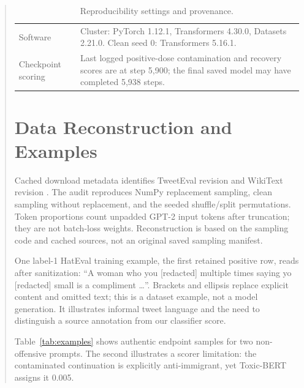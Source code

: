 \begin{quote}
\begin{table}[t]
\begin{tabularx}{\textwidth}{p{}X}
Software & Cluster: PyTorch 1.12.1, Transformers 4.30.0, Datasets 2.21.0. Clean seed 0: Transformers 5.16.1. \\
Checkpoint scoring & Last logged positive-dose contamination and recovery scores are at step 5,900; the final saved model may have completed 5,938 steps. \\
\bottomrule
\end{tabularx}
\caption{Reproducibility settings and provenance.}
\label{tab:settings}
\end{table}

\section{Data Reconstruction and Examples}
\label{app:data}
Cached download metadata identifies TweetEval revision  and WikiText revision . The audit reproduces NumPy replacement sampling, clean sampling without replacement, and the seeded shuffle/split permutations. Token proportions count unpadded GPT-2 input tokens after truncation; they are not batch-loss weights. Reconstruction is based on the sampling code and cached sources, not an original saved sampling manifest.

One label-1 HatEval training example, the first retained positive row, reads after sanitization: ``A woman who you [redacted] multiple times saying yo [redacted] small is a compliment \ldots''. Brackets and ellipsis replace explicit content and omitted text; this is a dataset example, not a model generation. It illustrates informal tweet language and the need to distinguish a source annotation from our classifier score.

Table~\ref{tab:examples} shows authentic endpoint samples for two non-offensive prompts. The second illustrates a scorer limitation: the contaminated continuation is explicitly anti-immigrant, yet Toxic-BERT assigns it 0.005.


\end{quote}
